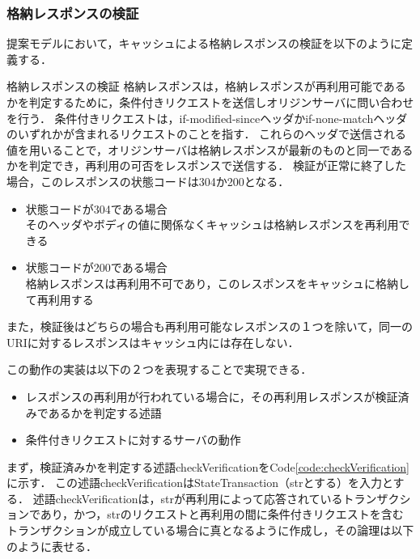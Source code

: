 \documentclass[12pt,a4paper]{jbook}
\begin{document}
\subsubsection{格納レスポンスの検証}
\label{sec:CacheVerification}
提案モデルにおいて，キャッシュによる格納レスポンスの検証を以下のように定義する．

\begin{itembox}[l]{格納レスポンスの検証}
格納レスポンスは，格納レスポンスが再利用可能であるかを判定するために，条件付きリクエストを送信しオリジンサーバに問い合わせを行う．
条件付きリクエストは，if-modified-sinceヘッダかif-none-matchヘッダのいずれかが含まれるリクエストのことを指す．
これらのヘッダで送信される値を用いることで，オリジンサーバは格納レスポンスが最新のものと同一であるかを判定でき，再利用の可否をレスポンスで送信する．
検証が正常に終了した場合，このレスポンスの状態コードは304か200となる．
\begin{itemize}
\item 状態コードが304である場合 \\
そのヘッダやボディの値に関係なくキャッシュは格納レスポンスを再利用できる
\item 状態コードが200である場合 \\
格納レスポンスは再利用不可であり，このレスポンスをキャッシュに格納して再利用する
\end{itemize}
また，検証後はどちらの場合も再利用可能なレスポンスの１つを除いて，同一のURIに対するレスポンスはキャッシュ内には存在しない．
\end{itembox}

この動作の実装は以下の２つを表現することで実現できる．
\begin{itemize}
\item レスポンスの再利用が行われている場合に，その再利用レスポンスが検証済みであるかを判定する述語
\item 条件付きリクエストに対するサーバの動作
\end{itemize}

まず，検証済みかを判定する述語checkVerificationをCode\ref{code:checkVerification}に示す．
この述語checkVerificationはStateTransaction（strとする）を入力とする．
述語checkVerificationは，strが再利用によって応答されているトランザクションであり，かつ，strのリクエストと再利用の間に条件付きリクエストを含むトランザクションが成立している場合に真となるように作成し，その論理は以下のように表せる．
\end{document}
